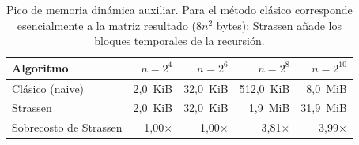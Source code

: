 %
\begin{table}[H]
\centering
\small
\caption{Pico de memoria dinámica auxiliar. Para el método clásico corresponde esencialmente a la matriz resultado ($8n^{2}$ bytes); Strassen añade los bloques temporales de la recursión.}
\label{tab:matrix-memory}
\begin{tabular}{lrrrr}
\hline\hline
Algoritmo & $n=2^{4}$ & $n=2^{6}$ & $n=2^{8}$ & $n=2^{10}$ \\
\hline
Clásico (naive) & 2,0~KiB & 32,0~KiB & 512,0~KiB & 8,0~MiB \\
Strassen & 2,0~KiB & 32,0~KiB & 1,9~MiB & 31,9~MiB \\
\hline
Sobrecosto de Strassen & 1{,}00$\times$ & 1{,}00$\times$ & 3{,}81$\times$ & 3{,}99$\times$ \\
\hline\hline
\end{tabular}
\end{table}
